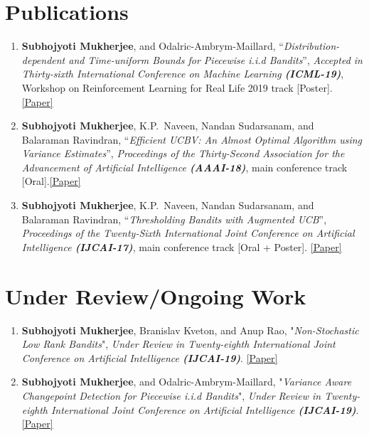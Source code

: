 \documentclass[margin,11pt]{res}
\begin{document}
\begin{resume}
\section{Publications}
\begin{enumerate}[leftmargin=*]
\item \textbf{Subhojyoti Mukherjee}, and Odalric-Ambrym-Maillard, ``\textit{Distribution-dependent and Time-uniform Bounds for Piecewise i.i.d Bandits}'', \textit{Accepted in Thirty-sixth International Conference on Machine Learning  \textbf{(ICML-19)}}, Workshop on Reinforcement Learning for Real Life 2019 track [Poster]. \href{https://github.com/Subhojyoti/INRIA_Intern/blob/master/ICML2019Workshop/paper.pdf}{[Paper]}
\item \textbf{Subhojyoti Mukherjee}, K.P.~Naveen, Nandan Sudarsanam, and Balaraman Ravindran, ``\textit{Efficient UCBV: An Almost Optimal Algorithm using Variance Estimates}'', \textit{Proceedings of the Thirty-Second Association for the Advancement of Artificial Intelligence \textbf{(AAAI-18)}}, main conference track [Oral].\href{https://www.aaai.org/ocs/index.php/AAAI/AAAI18/paper/view/16111}{[Paper]}
\item \textbf{Subhojyoti Mukherjee}, K.P.~Naveen, Nandan Sudarsanam, and Balaraman Ravindran, ``\textit{Thresholding Bandits with Augmented UCB}'', \textit{Proceedings of the Twenty-Sixth International Joint Conference on Artificial Intelligence \textbf{(IJCAI-17)}}, main conference track [Oral + Poster]. \href{https://www.ijcai.org/proceedings/2017/0350.pdf}{[Paper]}
\end{enumerate}

\section{Under Review/Ongoing Work}
\begin{enumerate}[leftmargin=*]
\item \textbf{Subhojyoti Mukherjee}, Branislav Kveton, and Anup Rao, "\textit{Non-Stochastic Low Rank Bandits}", \textit{Under Review in Twenty-eighth International Joint Conference on Artificial Intelligence \textbf{(IJCAI-19)}}. \href{https://github.com/Subhojyoti/Latent_Bandits/blob/master/IJCAI2019/bandit_paper.pdf}{[Paper]}
\item \textbf{Subhojyoti Mukherjee}, and Odalric-Ambrym-Maillard, "\textit{Variance Aware Changepoint Detection for Piecewise i.i.d Bandits}", \textit{Under Review in Twenty-eighth International Joint Conference on Artificial Intelligence \textbf{(IJCAI-19)}}. \href{https://github.com/Subhojyoti/INRIA_Intern/blob/master/IJCAI\%202019/ijcai19.pdf}{[Paper]}
\end{enumerate}


\end{resume}
\end{document}
